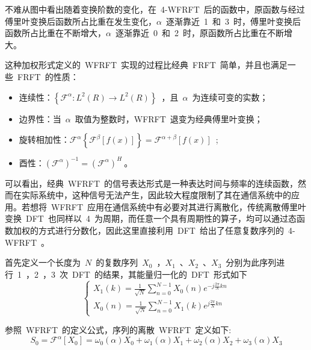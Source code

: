 不难从图中看出随着变换阶数的变化，在~4-WFRFT~后的函数中，原函数与经过傅里叶变换后函数所占比重在发生变化，$\alpha$~逐渐靠近~1~和~3~时，傅里叶变换后函数所占比重在不断增大，$\alpha$~逐渐靠近~0~和~2~时，原函数所占比重在不断增大。

这种加权形式定义的~WFRFT~实现的过程比经典~FRFT~简单，并且也满足一些~FRFT~的性质：
\begin{itemize}
\item 连续性：$\left\{ {{\mathcal{F}^\alpha }:{L^2}\left( R \right) \to {L^2}\left( R \right)} \right\}$~，且~$\alpha$~为连续可变的实数；
\item 边界性：当~$\alpha$~取值为整数时，WFRFT~退变为经典傅里叶变换；
\item 旋转相加性：${\mathcal{F}^\alpha }\left\{ {{\mathcal{F}^\beta }\left[ {f\left( x \right)} \right]} \right\} = {\mathcal{F}^{\alpha  + \beta }}\left[ {f\left( x \right)} \right]$~;
\item 酉性：${\left( {{\mathcal{F}^\alpha }} \right)^{ - 1}} = {\left( {{\mathcal{F}^\alpha }} \right)^H}~$。
\end{itemize}

可以看出，经典~WFRFT~的信号表达形式是一种表达时间与频率的连续函数，然而在实际系统中，这种信号无法产生，因此较大程度限制了其在通信系统中的应用。若想将~WFRFT~应用在通信系统中有必要对其进行离散化，传统离散傅里叶变换~DFT~也同样以~4~为周期，而任意一个具有周期性的算子，均可以通过态函数加权的方式进行分数化，因此这里直接利用~DFT~给出了任意复数序列的~4-WFRFT~。

首先定义一个长度为~$N$~的复数序列~${X_0}$~，${X_1}$~、${X_2}$~、${X_3}$~分别为此序列进行~1~，2~，3~次~DFT~的结果，其能量归一化的~DFT~形式如下
\begin{equation}
\left\{ \begin{array}{l}
{X_1}\left( k \right) = \frac{1}{{\sqrt N }}\sum\limits_{n = 0}^{N - 1} {{X_0}\left( n \right){e^{ - j\frac{{2\pi }}{N}kn}}} \\
{X_0}\left( n \right) = \frac{1}{{\sqrt N }}\sum\limits_{n = 0}^{N - 1} {{X_1}\left( k \right){e^{j\frac{{2\pi }}{N}kn}}}
\end{array} \right.
\end{equation}

参照~WFRFT~的定义公式，序列的离散~WFRFT~定义如下:
\begin{equation}
{S_0} = {\mathcal{F}^\alpha }\left[ {{X_0}} \right] = {\omega _0}\left( \alpha  \right){X_0} + {\omega _1}\left( \alpha  \right){X_1} + {\omega _2}\left( \alpha  \right){X_2} + {\omega _3}\left( \alpha  \right){X_3}
\end{equation}

